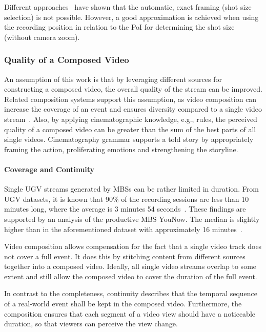 Different approaches~\cite{Arev2014,Saini2012} have shown that the automatic, exact framing (shot size selection) is not possible.
However, a good approximation is achieved when using the recording position in relation to the \ac{PoI} for determining the shot size  (without camera zoom).
\subsubsection{Quality of a Composed Video}
\label{sec:240_quality_composition}
An assumption of this work is that by leveraging different sources for constructing a composed video, the overall quality of the stream can be improved.
Related composition systems support this assumption, as video composition can increase the coverage of an event and ensures diversity compared to a single video stream~\cite{Arev2014,Saini2012,Shrestha2010,Wu2015}.
Also, by applying cinematographic knowledge, e.g., rules, the perceived quality of a composed video can be greater than the sum of the best parts of all single videos.
Cinematography grammar supports a told story by appropriately framing the action, proliferating emotions and strengthening the storyline.
\paragraph{Coverage and Continuity}
Single \ac{UGV} streams generated by \ac{MBS}s can be rather limited in duration.
From \ac{UGV} datasets, it is known that 90\% of the recording sessions are less than 10 minutes long, where the average is 3 minutes 54 seconds~\cite{Saini2013}.
These findings are supported by an analysis of the productive \ac{MBS} YouNow. 
The median is slightly higher than in the aforementioned dataset with approximately 16 minutes~\cite{Stohr2015}.

Video composition allows compensation for the fact that a single video track does not cover a full event. 
It does this by stitching content from different sources together into a composed video.
Ideally, all single video streams overlap to some extent and still allow the composed video to cover the duration of the full event.

In contrast to the completeness, continuity describes that the temporal sequence of a real-world event shall be kept in the composed video. 
Furthermore, the composition ensures that each segment of a video view should have a noticeable duration, so that viewers can perceive the view change.
